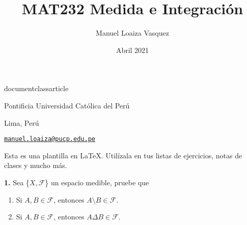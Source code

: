 documentclass{article}
\usepackage[utf8]{inputenc}
\usepackage{amsfonts,latexsym,amsthm,amssymb,amsmath,amscd,euscript}
\usepackage{mathtools}
\usepackage{framed}
\usepackage{hyperref}

\newenvironment{statement}[1]{\smallskip\noindent\color[rgb]{1.00,0.00,0.50} {\bf #1.}}{}
\allowdisplaybreaks[1]

\renewcommand*{\proofname}{Prueba}
\renewcommand{\contentsname}{Contenido}

\newtheorem{theorem}{Teorema}
\newtheorem*{proposition}{Proposici\'on}
\newtheorem{lemma}[theorem]{Lema}
\newtheorem{corollary}[theorem]{Corolario}
\newtheorem{conjecture}[theorem]{Conjetura}
\newtheorem*{postulate}{Postulado}
\theoremstyle{definition}
\newtheorem{defn}[theorem]{Definici\'on}
\newtheorem{example}[theorem]{Ejemplo}

\theoremstyle{remark}
\newtheorem*{remark}{Observaci\'on}
\newtheorem*{notation}{Notaci\'on}
\newtheorem*{note}{Nota}

\newcommand{\BR}{\mathbb R}
\newcommand{\BC}{\mathbb C}
\newcommand{\BF}{\mathbb F}
\newcommand{\BQ}{\mathbb Q}
\newcommand{\BZ}{\mathbb Z}
\newcommand{\BN}{\mathbb N}

\title{MAT232 Medida e Integraci\'on}
\author{Manuel Loaiza Vasquez}
\date{Abril 2021}



\maketitle

\vspace*{-0.25in}
\centerline{Pontificia Universidad Cat\'olica del Per\'u}
\centerline{Lima, Per\'u}
\centerline{\href{mailto:manuel.loaiza@pucp.edu.pe}{{\tt manuel.loaiza@pucp.edu.pe}}}
\vspace*{0.15in}

\begin{framed}
  Esta es una plantilla en \LaTeX. Util\'izala en tus listas de ejercicios, notas de clases y mucho m\'as.
\end{framed}

\begin{statement}{1}
  Sea \{$X, \mathcal{F}$\} un espacio medible, pruebe que
  \begin{enumerate}
    \item Si $A, B \in \mathcal{F}$, entonces $A \setminus B \in \mathcal{F}$.
    \item Si $A, B \in \mathcal{F}$, entonces $A \Delta B \in \mathcal{F}$.
  \end{enumerate}
\end{statement}

